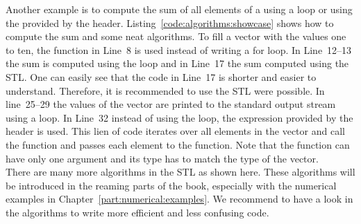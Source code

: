 

Another example is to compute the sum of all elements of a  using a  loop or using the  provided by the  header. Listing~\ref{code:algorithms:showcase} shows how to compute the sum and some neat algorithms. To fill a vector with the values one to ten, the function  in Line~8 is used instead of writing a for loop. In Line~12--13 the sum is computed using the loop and in Line~17 the sum computed using the STL. One can easily see that the code in Line~17 is shorter and easier to understand. Therefore, it is recommended to use the STL were possible. In line~25--29 the values of the vector are printed to the standard output stream using a  loop. In Line~32 instead of using the  loop, the expression  provided by the  header is used. This lien of code iterates over all elements in the vector and call the function  and passes each element to the function. Note that the function can have only one argument and its type has to match the type of the vector.\\

There are many more algorithms in the STL as shown here. These algorithms will be introduced in the reaming parts of the book, especially with the numerical examples in Chapter~\ref{part:numerical:examples}. We recommend to have a look in the algorithms to write more efficient and less confusing code.   


